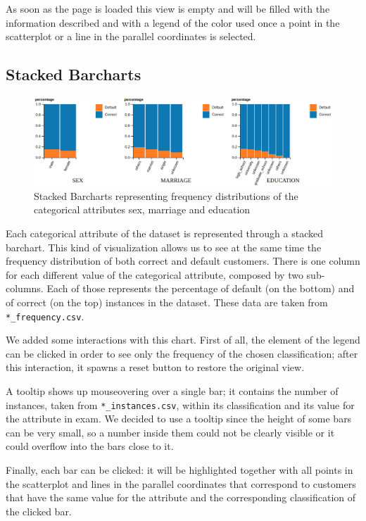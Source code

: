 \documentclass[journal]{vgtc}                %
\begin{document}
As soon as the page is loaded this view is empty and will be filled with the information described and with a legend of the color used once a point in the scatterplot or a line in the parallel coordinates is selected.

\subsection{Stacked Barcharts}
\begin{figure}[h]
  \centering
  \includegraphics[scale=0.15]{stacked}
  \caption{Stacked Barcharts representing frequency distributions of the categorical attributes sex, marriage and education}
  \label{stacked}
\end{figure}

Each categorical attribute of the dataset is represented through a stacked barchart. This kind of visualization allows us to see at the same time the frequency distribution of both correct and default customers.
There is one column for each different value of the categorical attribute, composed by two sub-columns. Each of those represents the percentage of default (on the bottom) and of correct (on the top) instances in the dataset.
These data are taken from \texttt{*\_frequency.csv}.

We added some interactions with this chart. First of all, the element of the legend can be clicked in order to see only the frequency of the chosen classification;
after this interaction, it spawns a reset button to restore the original view.

A tooltip shows up mouseovering over a single bar; it contains the number of instances, taken from \texttt{*\_instances.csv}, within its classification and its value for the attribute in exam. We decided to use a tooltip since the height of some bars
can be very small, so a number inside them could not be clearly visible or it could overflow into the bars close to it.

Finally, each bar can be clicked: it will be highlighted together with all points in the scatterplot and lines in the parallel coordinates that correspond to customers
that have the same value for the attribute and the corresponding classification of the clicked bar.
\end{document}
